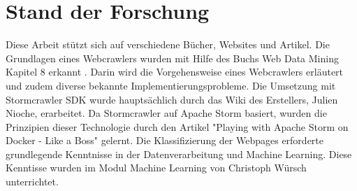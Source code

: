 \chapter{Stand der Forschung}
Diese Arbeit stützt sich auf verschiedene Bücher, Websites und Artikel.
Die Grundlagen eines Webcrawlers wurden mit Hilfe des Buchs \glqq Web Data Mining\grqq{} Kapitel 8 erkannt \cite{liu2007web}. %
Darin wird die Vorgehensweise eines Webcrawlers erläutert und zudem diverse bekannte Implementierungsprobleme.
Die Umsetzung mit Stormcrawler SDK wurde hauptsächlich durch das Wiki des Erstellers, Julien Nioche, erarbeitet. %
Da Stormcrawler auf Apache Storm basiert, wurden die Prinzipien dieser Technologie durch den Artikel "Playing with Apache Storm on Docker - Like a Boss" gelernt. %
Die Klassifizierung der Webpages erforderte grundlegende Kenntnisse in der Datenverarbeitung und Machine Learning.
Diese Kenntisse wurden im Modul \glqq Machine Learning\grqq{} von Christoph Würsch unterrichtet. %

